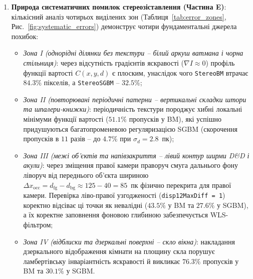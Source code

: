 \documentclass[14pt, a4paper]{extarticle}
\begin{document}
\begin{enumerate}
\begin{itemize}
        \item на \textit{дальньому плані стін і вікна} ($Z_{\text{meas}} = 312.0$--$348.0$~см: точки №~9 «Логотип кондиціонера», №~6 «Ручка вікна» та №~13 «Кут рами вікна» при $d = 45.6$--$47.0$~пк і чутливістю $7.13$--$7.56$~см/пк) похибка зростає до $\mathbf{15.0}$--$\mathbf{28.8}$~см ($\delta_Z = 4.56\%$--$9.19\%$). У найвіддаленішій точці №~12 («Кут візерунку на шпалерах в куті кімнати», $Z_{\text{meas}} = 348.0$~см, $d = 38.1$~пк), де ціна поділки $1$~пк сягає $10.87$~см/пк і діє періодична текстура шпалер, похибка досягає $65.6$~см ($\delta_Z = 18.85\%$). Систематичне перевищення $Z_{\text{calc}}$ над $Z_{\text{meas}}$ на $\sim 4\%$--$6\%$ у більшості точок пояснюється поєднанням похибки ручного витримування бази ($\Delta B \approx -4\dots{-5}$~мм при номіналі $100$~мм) та різницею між радіальною відстанню рулетки $R = \sqrt{X^2+Y^2+Z^2}$ і проєкцією $Z$ на оптичну вісь.
    \end{itemize}

    \item \textbf{Природа систематичних помилок стереозіставлення (Частина E)}: кількісний аналіз чотирьох виділених зон (Таблиця~\ref{tab:error_zones}, Рис.~\ref{fig:systematic_errors}) демонструє чотири фундаментальні джерела похибок:
    \begin{itemize}
        \item \textit{Зона I (однорідні ділянки без текстури -- білий аркуш ватмана і чорна стільниця)}: через відсутність градієнтів яскравості ($\nabla I \approx 0$) профіль функції вартості $C(x, y, d)$ є плоским, унаслідок чого \texttt{StereoBM} втрачає $84.3\%$ пікселів, а \texttt{StereoSGBM} -- $32.5\%$;
        \item \textit{Зона II (повторювані періодичні патерни -- вертикальні складки штори та шпалери-книжки)}: періодичність текстури породжує хибні локальні мінімуми функції вартості ($51.1\%$ пропусків у BM), які успішно придушуються багатопроменевою регуляризацією SGBM (скорочення пропусків в $11$ разів -- до $4.7\%$ при $\sigma_d = 2.8$~пк);
        \item \textit{Зона III (межі об'єктів та напівзакриття -- лівий контур ширми D\&D і акули)}: через зміщення правої камери праворуч смуга дальнього фону ліворуч від переднього об'єкта шириною $\Delta x_{\text{occ}} = d_{\text{fg}} - d_{\text{bg}} \approx 125 - 40 = 85$~пк фізично перекрита для правої камери. Перевірка ліво-правої узгодженості (\texttt{disp12MaxDiff = 1}) коректно відсіває ці точки як невалідні ($43.5\%$ у BM та $27.6\%$ у SGBM), а їх коректне заповнення фоновою глибиною забезпечується WLS-фільтром;
        \item \textit{Зона IV (відблиски та дзеркальні поверхні -- скло вікна)}: накладання дзеркального відображення кімнати на площину скла порушує ламбертівську інваріантність яскравості й викликає $76.3\%$ пропусків у BM та $30.1\%$ у SGBM.
    \end{itemize}
\end{enumerate}
\end{document}
